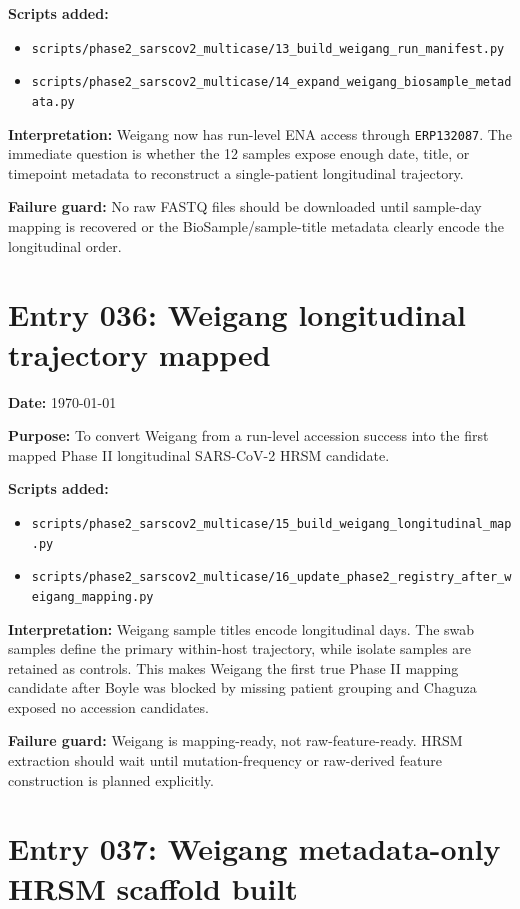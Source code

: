 \textbf{Scripts added:}
\begin{itemize}
    \item \texttt{scripts/phase2\_sarscov2\_multicase/13\_build\_weigang\_run\_manifest.py}
    \item \texttt{scripts/phase2\_sarscov2\_multicase/14\_expand\_weigang\_biosample\_metadata.py}
\end{itemize}

\textbf{Interpretation:} Weigang now has run-level ENA access through \texttt{ERP132087}. The immediate question is whether the 12 samples expose enough date, title, or timepoint metadata to reconstruct a single-patient longitudinal trajectory.

\textbf{Failure guard:} No raw FASTQ files should be downloaded until sample-day mapping is recovered or the BioSample/sample-title metadata clearly encode the longitudinal order.


\section*{Entry 036: Weigang longitudinal trajectory mapped}

\textbf{Date:} \today

\textbf{Purpose:} To convert Weigang from a run-level accession success into the first mapped Phase II longitudinal SARS-CoV-2 HRSM candidate.

\textbf{Scripts added:}
\begin{itemize}
    \item \texttt{scripts/phase2\_sarscov2\_multicase/15\_build\_weigang\_longitudinal\_map.py}
    \item \texttt{scripts/phase2\_sarscov2\_multicase/16\_update\_phase2\_registry\_after\_weigang\_mapping.py}
\end{itemize}

\textbf{Interpretation:} Weigang sample titles encode longitudinal days. The swab samples define the primary within-host trajectory, while isolate samples are retained as controls. This makes Weigang the first true Phase II mapping candidate after Boyle was blocked by missing patient grouping and Chaguza exposed no accession candidates.

\textbf{Failure guard:} Weigang is mapping-ready, not raw-feature-ready. HRSM extraction should wait until mutation-frequency or raw-derived feature construction is planned explicitly.

\section*{Entry 037: Weigang metadata-only HRSM scaffold built}

